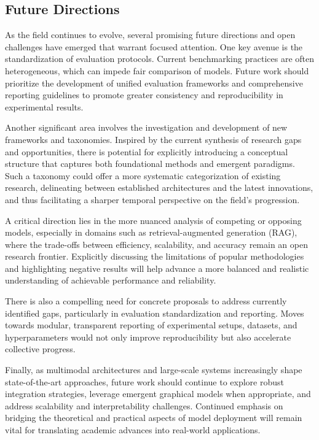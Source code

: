 \documentclass[sigconf]{acmart}
\begin{document}
\subsection{Future Directions}

As the field continues to evolve, several promising future directions and open challenges have emerged that warrant focused attention. One key avenue is the standardization of evaluation protocols. Current benchmarking practices are often heterogeneous, which can impede fair comparison of models. Future work should prioritize the development of unified evaluation frameworks and comprehensive reporting guidelines to promote greater consistency and reproducibility in experimental results.

Another significant area involves the investigation and development of new frameworks and taxonomies. Inspired by the current synthesis of research gaps and opportunities, there is potential for explicitly introducing a conceptual structure that captures both foundational methods and emergent paradigms. Such a taxonomy could offer a more systematic categorization of existing research, delineating between established architectures and the latest innovations, and thus facilitating a sharper temporal perspective on the field’s progression.

A critical direction lies in the more nuanced analysis of competing or opposing models, especially in domains such as retrieval-augmented generation (RAG), where the trade-offs between efficiency, scalability, and accuracy remain an open research frontier. Explicitly discussing the limitations of popular methodologies and highlighting negative results will help advance a more balanced and realistic understanding of achievable performance and reliability.

There is also a compelling need for concrete proposals to address currently identified gaps, particularly in evaluation standardization and reporting. Moves towards modular, transparent reporting of experimental setups, datasets, and hyperparameters would not only improve reproducibility but also accelerate collective progress.

Finally, as multimodal architectures and large-scale systems increasingly shape state-of-the-art approaches, future work should continue to explore robust integration strategies, leverage emergent graphical models when appropriate, and address scalability and interpretability challenges. Continued emphasis on bridging the theoretical and practical aspects of model deployment will remain vital for translating academic advances into real-world applications.
\end{document}
